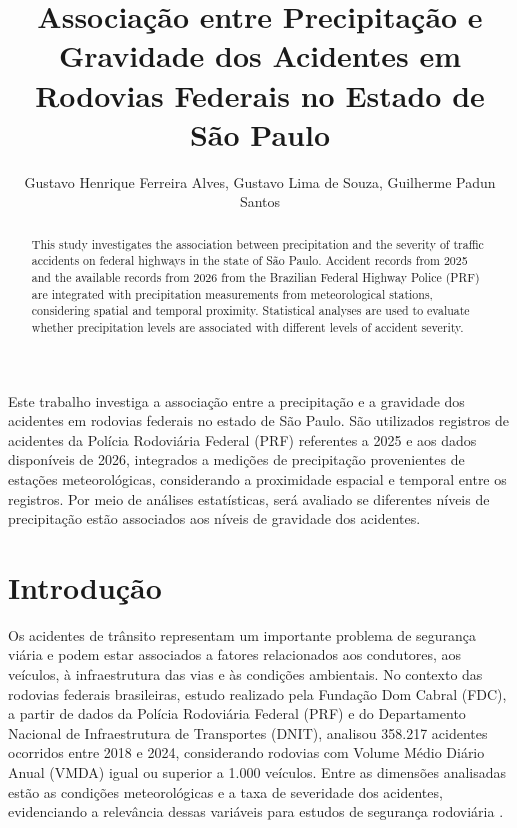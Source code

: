 \documentclass[12pt]{article}
\title{Associação entre Precipitação e Gravidade dos Acidentes em Rodovias Federais no Estado de São Paulo}
\author{Gustavo Henrique Ferreira Alves\inst{1}, Gustavo Lima de Souza\inst{1}, Guilherme Padun Santos\inst{1}}
\begin{document}
 

\maketitle

\begin{abstract}
This study investigates the association between precipitation and the severity
of traffic accidents on federal highways in the state of São Paulo. Accident
records from 2025 and the available records from 2026 from the Brazilian
Federal Highway Police (PRF) are integrated with precipitation measurements
from meteorological stations, considering spatial and temporal proximity.
Statistical analyses are used to evaluate whether precipitation levels are
associated with different levels of accident severity.
\end{abstract}

\begin{resumo}
Este trabalho investiga a associação entre a precipitação e a gravidade dos
acidentes em rodovias federais no estado de São Paulo. São utilizados registros
de acidentes da Polícia Rodoviária Federal (PRF) referentes a 2025 e aos dados
disponíveis de 2026, integrados a medições de precipitação provenientes de
estações meteorológicas, considerando a proximidade espacial e temporal entre
os registros. Por meio de análises estatísticas, será avaliado se diferentes
níveis de precipitação estão associados aos níveis de gravidade dos acidentes.
\end{resumo}

\section{Introdução}

Os acidentes de trânsito representam um importante problema de segurança viária e podem estar associados a fatores relacionados aos condutores, aos veículos, à infraestrutura das vias e às condições ambientais. No contexto das rodovias federais brasileiras, estudo realizado pela Fundação Dom Cabral (FDC), a partir de dados da Polícia Rodoviária Federal (PRF) e do Departamento Nacional de Infraestrutura de Transportes (DNIT), analisou 358.217 acidentes ocorridos entre 2018 e 2024, considerando rodovias com Volume Médio Diário Anual (VMDA) igual ou superior a 1.000 veículos. Entre as dimensões analisadas estão as condições meteorológicas e a taxa de severidade dos acidentes, evidenciando a relevância dessas variáveis para estudos de segurança rodoviária \cite{fdc2025}.
\end{document}

